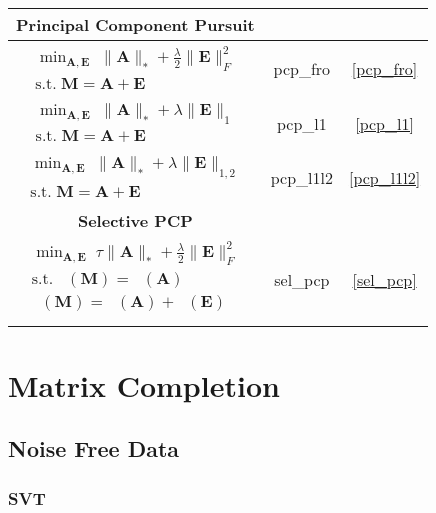 \documentclass{article}
\DeclareMathOperator*{\pro}{\mathcal P_{\Omega}}
\DeclareMathOperator*{\proa}{\mathcal P_{\Psi}}
\begin{document}
\begin{table}[!h]
{{\begin{tabular}{c | c | c}
\hline
{\bf Principal Component Pursuit}\\

\hline
$\begin{array}{c} \min_{\mathbf{A,E}} \; \| \mathbf A \|_* + \frac{\lambda}{2} \| \mathbf E \|_F^2\\
\text{s.t.} \; \mathbf { M = A + E } \end{array}$ & pcp\_fro & \ref{pcp_fro} \\

\hline
$\begin{array}{c} \min_{\mathbf{A,E}} \; \| \mathbf A \|_* + \lambda \| \mathbf E \|_1\\
\text{s.t.} \; \mathbf { M = A + E } \end{array}$ & pcp\_l1 & \ref{pcp_l1}  \\

\hline
$\begin{array}{c} \min_{\mathbf{A,E}} \; \| \mathbf A \|_* + \lambda \| \mathbf E \|_{1,2}\\
\text{s.t.} \; \mathbf { M = A + E } \end{array}$ & pcp\_l1l2 & \ref{pcp_l1l2} \\


\hline
{\bf Selective PCP}\\

\hline
$\begin{array}{c} \min_{\mathbf A, \mathbf E} \;  \tau \| \mathbf A \|_* + \frac{\lambda}{2} \| \mathbf E \|^2_F \\
\text{s.t.} \; \pro(\mathbf{M}) = \pro(\mathbf{A}) \nonumber \\
\proa(\mathbf{M}) = \proa(\mathbf{A}) + \proa(\mathbf E) \nonumber \\  \end{array}$  & sel\_pcp & \ref{sel_pcp}

\end{tabular}
}}
\end{table}

\newpage
\section{Matrix Completion}

\subsection{Noise Free Data}

\subsubsection{SVT}
\label{mc_svt}
\end{document}
